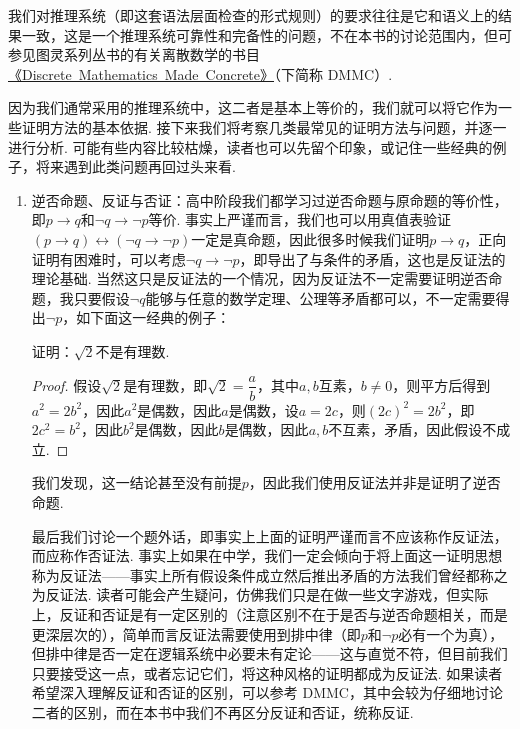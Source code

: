 我们对推理系统（即这套语法层面检查的形式规则）的要求往往是它和语义上的结果一致，这是一个推理系统可靠性和完备性的问题，不在本书的讨论范围内，但可参见图灵系列丛书的有关离散数学的书目\href{https://github.com/FrightenedFoxCN/Discrete-Mathematics-Made-Concrete}{《Discrete\ Mathematics\ Made\ Concrete》}（下简称 DMMC）.

因为我们通常采用的推理系统中，这二者是基本上等价的，我们就可以将它作为一些证明方法的基本依据. 接下来我们将考察几类最常见的证明方法与问题，并逐一进行分析. 可能有些内容比较枯燥，读者也可以先留个印象，或记住一些经典的例子，将来遇到此类问题再回过头来看.

\begin{enumerate}
    \item 逆否命题、反证与否证：高中阶段我们都学习过逆否命题与原命题的等价性，即$p\to q$和$\lnot q\to\lnot p$等价. 事实上严谨而言，我们也可以用真值表验证$(p\to q)\leftrightarrow(\lnot q\to\lnot p)$一定是真命题，因此很多时候我们证明$p\to q$，正向证明有困难时，可以考虑$\lnot q\to\lnot p$，即导出了与条件的矛盾，这也是反证法的理论基础. 当然这只是反证法的一个情况，因为反证法不一定需要证明逆否命题，我只要假设$\lnot q$能够与任意的数学定理、公理等矛盾都可以，不一定需要得出$\lnot p$，如下面这一经典的例子：

          \begin{example}{}{}
              证明：$\sqrt{2}$不是有理数.
          \end{example}
          \begin{proof}
              假设$\sqrt{2}$是有理数，即$\sqrt{2}=\dfrac{a}{b}$，其中$a,b$互素，$b\neq 0$，则平方后得到$a^2=2b^2$，因此$a^2$是偶数，因此$a$是偶数，设$a=2c$，则$(2c)^2=2b^2$，即$2c^2=b^2$，因此$b^2$是偶数，因此$b$是偶数，因此$a,b$不互素，矛盾，因此假设不成立.
          \end{proof}

          我们发现，这一结论甚至没有前提$p$，因此我们使用反证法并非是证明了逆否命题.

          最后我们讨论一个题外话，即事实上上面的证明严谨而言不应该称作反证法，而应称作否证法. 事实上如果在中学，我们一定会倾向于将上面这一证明思想称为反证法——事实上所有假设条件成立然后推出矛盾的方法我们曾经都称之为反证法. 读者可能会产生疑问，仿佛我们只是在做一些文字游戏，但实际上，反证和否证是有一定区别的（注意区别不在于是否与逆否命题相关，而是更深层次的），简单而言反证法需要使用到排中律（即$p$和$\lnot p$必有一个为真），但排中律是否一定在逻辑系统中必要未有定论——这与直觉不符，但目前我们只要接受这一点，或者忘记它们，将这种风格的证明都成为反证法. 如果读者希望深入理解反证和否证的区别，可以参考 DMMC，其中会较为仔细地讨论二者的区别，而在本书中我们不再区分反证和否证，统称反证.


\end{enumerate}
